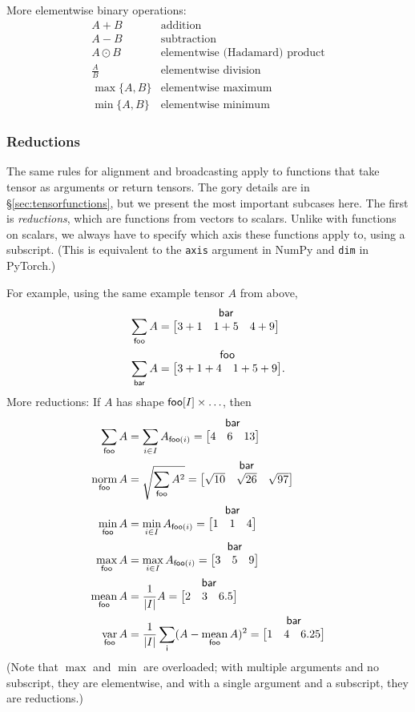 \documentclass{article}
\makeatletter
\newcommand{\nmatrix}[3]{\name{#1}\begin{array}[b]{@{}c@{}}\name{#2}\\\begin{bmatrix}#3\end{bmatrix}\end{array}}
\makeatother
\begin{document}
More elementwise binary operations:
\[\begin{array}{cl}
A+B & \text{addition} \\
A-B & \text{subtraction} \\
A\odot B & \text{elementwise (Hadamard) product} \\
\displaystyle\frac{A}{B} & \text{elementwise division} \\[1.2ex]
\max \{A, B\} & \text{elementwise maximum} \\
\min \{A, B\} & \text{elementwise minimum}
\end{array}\]

\subsubsection{Reductions}

The same rules for alignment and broadcasting apply to functions that take tensor as arguments or return tensors. The gory details are in \S\ref{sec:tensorfunctions}, but we present the most important subcases here. The first is \emph{reductions}, which are functions from vectors to scalars. Unlike with functions on scalars, we always have to specify which axis these functions apply to, using a subscript. (This is equivalent to the \verb|axis| argument in NumPy and \verb|dim| in PyTorch.)

For example, using the same example tensor $A$ from above,
\begin{align*}
\nsum{foo} A &= \nmatrix{}{bar}{
  3+1 & 1+5 & 4+9
} \\
\nsum{bar} A &= \nmatrix{}{foo}{
  3+1+4 & 1+5+9
}.
\end{align*}
More reductions: If $A$ has shape $\mathsf{foo}[I] \times \ldots$, then
\begin{align*}
  \nsum{foo} A &= \sum_{i \in I} A_{\nidx{foo}{i}} = \nmatrix{}{bar}{4 & 6 & 13} \\
  \nfun{foo}{norm} A &= \sqrt{\nsum{foo} A^2} = \nmatrix{}{bar}{\sqrt{10} & \sqrt{26} & \sqrt{97}} \\
  \nfun{foo}{min} A &= \min_{i \in I} A_{\nidx{foo}{i}} = \nmatrix{}{bar}{1 & 1 & 4} \\
  \nfun{foo}{max} A &= \max_{i \in I} A_{\nidx{foo}{i}} = \nmatrix{}{bar}{3 & 5 & 9} \\
  \nfun{foo}{mean} A &= \frac{1}{|I|} A = \nmatrix{}{bar}{2 & 3 & 6.5} \\
  \nfun{foo}{var} A &= \frac1{|I|} \nsum{i} (A - \nfun{foo}{mean} A)^2 = \nmatrix{}{bar}{1 & 4 & 6.25}
\end{align*}
(Note that $\max$ and $\min$ are overloaded; with multiple arguments and no subscript, they are elementwise, and with a single argument and a subscript, they are reductions.)
\end{document}
